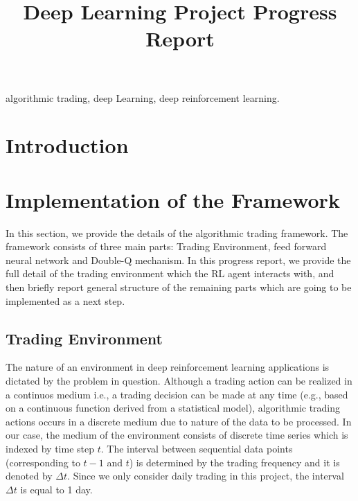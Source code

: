 \documentclass[conference]{IEEEtran}
\begin{document}
\title{Deep Learning Project Progress Report}

\author{
}

\maketitle

\begin{abstract}

\end{abstract}

\begin{IEEEkeywords}
algorithmic trading, deep Learning, deep reinforcement learning.
\end{IEEEkeywords}

\section{Introduction}

\section{Implementation of the Framework}

In this section, we provide the details of the algorithmic trading framework. The framework consists of three main parts: Trading Environment, feed forward neural network and Double-Q mechanism. In this progress report, we provide the full detail of the trading environment which the RL agent interacts with, and then briefly report general structure of the remaining parts which are going to be implemented as a next step. 
 

\subsection{Trading Environment}

The nature of an environment in deep reinforcement learning applications is dictated by the problem in question. Although a trading action can be realized in a continuos medium i.e., a trading decision can be made at any time (e.g., based on a continuous function derived from a statistical model), algorithmic trading actions occurs in a discrete medium due to nature of the data to be processed.  In our case, the medium of the environment consists of discrete time series which is indexed by time step \(t\). The interval between sequential data points (corresponding to \(t-1\) and \(t\)) is determined by the trading frequency and it is denoted by \(\Delta t\). Since we only consider daily trading in this project, the interval \(\Delta t\) is equal to 1 day. 
\end{document}
